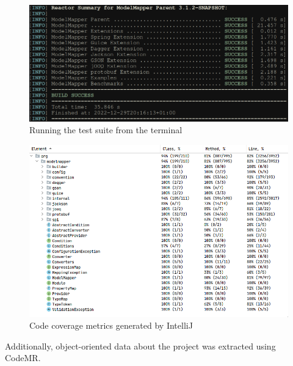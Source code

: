 \documentclass[12pt]{article}
\begin{document}
\begin{figure}[H]
    \centering
    \includegraphics[width=14cm]{images/test-suite.png}
    \caption{Running the test suite from the terminal}
    \label{running-test-suite}
\end{figure}

\begin{figure}[H]
    \centering
    \includegraphics[width=14cm]{images/code-coverage.png}
    \caption{Code coverage metrics generated by IntelliJ}
    \label{intellij-code-coverage}
\end{figure}

Additionally, object-oriented data about the project was
extracted using CodeMR.
\end{document}
